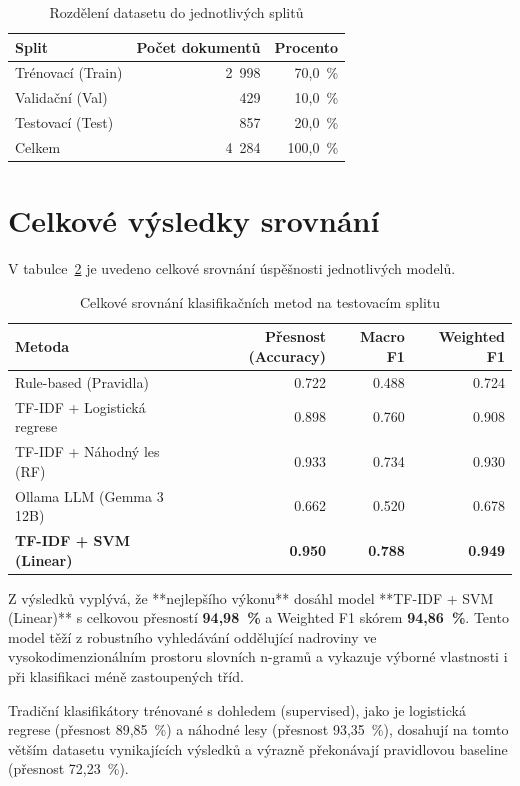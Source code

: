 \documentclass[czech, oth, kky, he, iso690alph, pdf, viewonly]{fasthesis}%
\begin{document}
\begin{table}[h]
\centering
\caption{Rozdělení datasetu do jednotlivých splitů}
\label{tab:splits}
\begin{tabular}{lrr}
\hline
Split & Počet dokumentů & Procento \\
\hline
Trénovací (Train) & 2~998 & 70,0~\% \\
Validační (Val) & 429 & 10,0~\% \\
Testovací (Test) & 857 & 20,0~\% \\
\hline
Celkem & 4~284 & 100,0~\% \\
\hline
\end{tabular}
\end{table}

\section{Celkové výsledky srovnání}
V tabulce~\ref{tab:results} je uvedeno celkové srovnání úspěšnosti jednotlivých modelů.

\begin{table}[h]
\centering
\caption{Celkové srovnání klasifikačních metod na testovacím splitu}
\label{tab:results}
\begin{tabular}{lrrr}
\hline
Metoda & Přesnost (Accuracy) & Macro F1 & Weighted F1 \\
\hline
Rule-based (Pravidla) & 0.722 & 0.488 & 0.724 \\
TF-IDF + Logistická regrese & 0.898 & 0.760 & 0.908 \\
TF-IDF + Náhodný les (RF) & 0.933 & 0.734 & 0.930 \\
Ollama LLM (Gemma 3 12B) & 0.662 & 0.520 & 0.678 \\
\textbf{TF-IDF + SVM (Linear)} & \textbf{0.950} & \textbf{0.788} & \textbf{0.949} \\
\hline
\end{tabular}
\end{table}

Z výsledků vyplývá, že **nejlepšího výkonu** dosáhl model **TF-IDF + SVM (Linear)** s celkovou přesností \textbf{94,98~\%} a Weighted F1 skórem \textbf{94,86~\%}. Tento model těží z robustního vyhledávání oddělující nadroviny ve vysokodimenzionálním prostoru slovních n-gramů a vykazuje výborné vlastnosti i při klasifikaci méně zastoupených tříd.

Tradiční klasifikátory trénované s dohledem (supervised), jako je logistická regrese (přesnost 89,85~\%) a náhodné lesy (přesnost 93,35~\%), dosahují na tomto větším datasetu vynikajících výsledků a výrazně překonávají pravidlovou baseline (přesnost 72,23~\%). 
\end{document}
